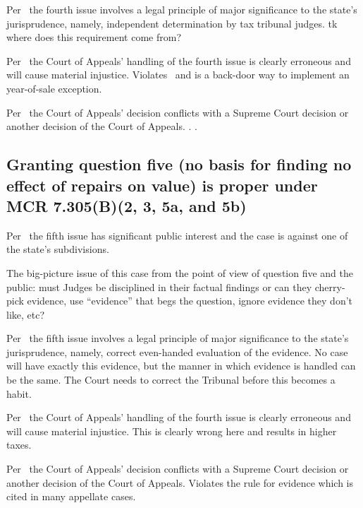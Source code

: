 \documentclass[12pt,\documentclassflag]{michiganCourtOfAppealsBrief}
\begin{document}
Per \cite{MCR 7.305(B)(3)}\ the fourth issue involves a legal principle of major significance to the state's jurisprudence, namely, independent determination by tax tribunal judges. tk where does this requirement come from?

Per \cite{MCR 7.305(B)(5a)}\ the Court of Appeals' handling of the fourth  issue is clearly erroneous and will cause material injustice. Violates \cite{Jones & Laughlin}\ and is a back-door way to implement an year-of-sale exception.

Per \cite{MCR 7.305(B)(5b)}\ the Court of Appeals' decision conflicts with a Supreme Court decision or another decision of the Court of Appeals. \cite{Jones & Laughlin}. \cite{Jones & Laughlin}.

\subsection{Granting question five (no basis for finding no effect of repairs on value) is proper under MCR 7.305(B)(2, 3, 5a, and 5b)}

Per \cite{MCR 7.305(B)(2)}\ the fifth issue has significant public interest and the case is against one of the state's subdivisions.

The big-picture issue of this case from the point of view of question five and the public: must Judges be disciplined in their factual findings or can they cherry-pick evidence, use ``evidence'' that begs the question, ignore evidence they don't like, etc?

Per \cite{MCR 7.305(B)(3)}\ the fifth issue involves a legal principle of major significance to the state's jurisprudence, namely, correct even-handed evaluation of the evidence. No case will have exactly this evidence, but the manner in which evidence is handled can be the same. The Court needs to correct the Tribunal before this becomes a habit.

Per \cite{MCR 7.305(B)(5a)}\ the Court of Appeals' handling of the fourth  issue is clearly erroneous and will cause material injustice. This is clearly wrong here and results in higher taxes.

Per \cite{MCR 7.305(B)(5b)}\ the Court of Appeals' decision conflicts with a Supreme Court decision or another decision of the Court of Appeals. Violates the rule for evidence which is cited in many appellate cases.



\end{document}
